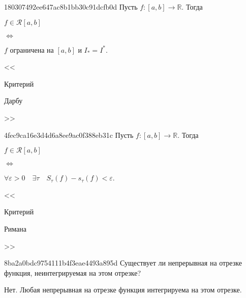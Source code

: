 \begin{note}{180307492ee647ac8b1bb30c91dcfb0d}
    Пусть \({ f : \left[ a, b \right]  \to \mathbb R }\). Тогда
    \begin{center}
        \begin{icloze}{2}\({ f \in \mathcal R\left[ a, b \right] }\)\end{icloze} \begin{icloze}{3}\({ \iff }\)\end{icloze} \begin{icloze}{1}\({ f }\) ограничена на \({ \left[ a, b \right] }\) и \({ I_* = I^* }\).\end{icloze}
    \end{center}

    \begin{center}
        \tiny
        <<\begin{icloze}{3}Критерий\end{icloze} \begin{icloze}{4}Дарбу\end{icloze}>>
    \end{center}
\end{note}

\begin{note}{4fec9ca16e3d4d6a8ee9ac0f388eb31c}
    Пусть \({ f : \left[ a, b \right]  \to \mathbb R }\). Тогда
    \begin{center}
        \begin{icloze}{2}\({ f \in \mathcal R\left[ a, b \right] }\)\end{icloze} \begin{icloze}{3}\({ \iff }\)\end{icloze} \begin{icloze}{1}\({ \forall \varepsilon > 0 \quad \exists \tau \quad S_\tau (f) - s_\tau (f) < \varepsilon }\).\end{icloze}
    \end{center}

    \begin{center}
        \tiny
        <<\begin{icloze}{3}Критерий\end{icloze} \begin{icloze}{4}Римана\end{icloze}>>
    \end{center}
\end{note}

\begin{note}{8ba2a0bdc9754111b4f3eae4493a895d}
    Существует ли непрерывная на отрезке функция, неинтегрируемая на этом отрезке?

    \begin{cloze}{1}
        Нет. Любая непрерывная на отрезке функция интегрируема на этом отрезке.
    \end{cloze}
\end{note}

